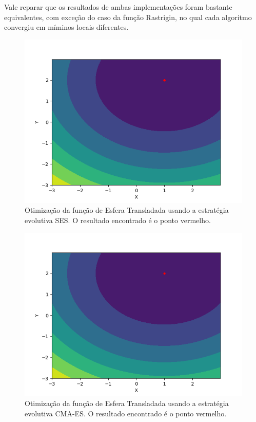 \documentclass[conference]{IEEEtran}
\begin{document}
Vale reparar que os resultados de ambas implementações foram bastante equivalentes, com exceção do caso da função Rastrigin, no qual cada algoritmo convergiu em míminos locais diferentes.

\begin{figure}[htbp]
\centering
\centerline{\includegraphics[scale=0.6]{imagens/translated_sphere/ses.png}}
\caption{Otimização da função de Esfera Transladada usando a estratégia evolutiva SES. O resultado encontrado é o ponto vermelho.}
\label{translated_sphere/ses}
\end{figure}

\begin{figure}[htbp]
\centering
\centerline{\includegraphics[scale=0.6]{imagens/translated_sphere/cmaes.png}}
\caption{Otimização da função de Esfera Transladada usando a estratégia evolutiva CMA-ES. O resultado encontrado é o ponto vermelho.}
\label{translated_sphere/cmaes}
\end{figure}
\end{document}
